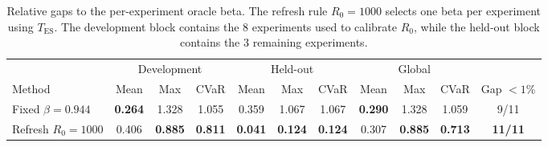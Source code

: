 \begin{table}[ht]
\centering
\small
\caption{Relative gaps to the per-experiment oracle beta. The refresh rule \(R_0=1000\) selects one beta per experiment using \(T_{\mathrm{ES}}\). The development block contains the 8 experiments used to calibrate \(R_0\), while the held-out block contains the 3 remaining experiments.}
\label{tab:main-results}
\setlength{\tabcolsep}{5pt}
\begin{tabular*}{\textwidth}{@{\extracolsep{\fill}}lcccccccccc}
\toprule
& \multicolumn{3}{c}{Development} 
& \multicolumn{3}{c}{Held-out} 
& \multicolumn{3}{c}{Global}
& \\
\cmidrule(lr){2-4}
\cmidrule(lr){5-7}
\cmidrule(lr){8-10}
Method 
& Mean & Max & CVaR 
& Mean & Max & CVaR 
& Mean & Max & CVaR 
& Gap \(<1\%\) \\
\midrule
Fixed \(\beta=0.944\)
& \textbf{0.264} & 1.328 & 1.055
& 0.359 & 1.067 & 1.067
& \textbf{0.290} & 1.328 & 1.059
& 9/11 \\

Refresh \(R_0=1000\)
& 0.406 & \textbf{0.885} & \textbf{0.811}
& \textbf{0.041} & \textbf{0.124} & \textbf{0.124}
& 0.307 & \textbf{0.885} & \textbf{0.713}
& \textbf{11/11} \\

\bottomrule
\end{tabular*}
\end{table}
